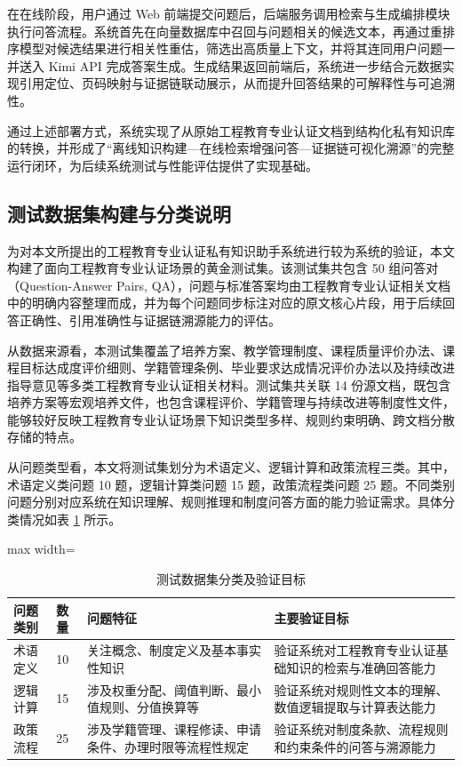 \documentclass[UTF8,a4paper,zihao=-4]{ctexart}
\begin{document}
在在线阶段，用户通过 Web 前端提交问题后，后端服务调用检索与生成编排模块执行问答流程。系统首先在向量数据库中召回与问题相关的候选文本，再通过重排序模型对候选结果进行相关性重估，筛选出高质量上下文，并将其连同用户问题一并送入 Kimi API 完成答案生成。生成结果返回前端后，系统进一步结合元数据实现引用定位、页码映射与证据链联动展示，从而提升回答结果的可解释性与可追溯性。

通过上述部署方式，系统实现了从原始工程教育专业认证文档到结构化私有知识库的转换，并形成了“离线知识构建—在线检索增强问答—证据链可视化溯源”的完整运行闭环，为后续系统测试与性能评估提供了实现基础。

\subsection{测试数据集构建与分类说明}

为对本文所提出的工程教育专业认证私有知识助手系统进行较为系统的验证，本文构建了面向工程教育专业认证场景的黄金测试集。该测试集共包含 50 组问答对（Question-Answer Pairs, QA），问题与标准答案均由工程教育专业认证相关文档中的明确内容整理而成，并为每个问题同步标注对应的原文核心片段，用于后续回答正确性、引用准确性与证据链溯源能力的评估。

从数据来源看，本测试集覆盖了培养方案、教学管理制度、课程质量评价办法、课程目标达成度评价细则、学籍管理条例、毕业要求达成情况评价办法以及持续改进指导意见等多类工程教育专业认证相关材料。测试集共关联 14 份源文档，既包含培养方案等宏观培养文件，也包含课程评价、学籍管理与持续改进等制度性文件，能够较好反映工程教育专业认证场景下知识类型多样、规则约束明确、跨文档分散存储的特点。

从问题类型看，本文将测试集划分为术语定义、逻辑计算和政策流程三类。其中，术语定义类问题 10 题，逻辑计算类问题 15 题，政策流程类问题 25 题。不同类别问题分别对应系统在知识理解、规则推理和制度问答方面的能力验证需求。具体分类情况如表 \ref{tab:testset_category} 所示。

\begin{table}[H]
\centering
\caption{测试数据集分类及验证目标}
\label{tab:testset_category}
{\small
\renewcommand{\arraystretch}{1.2}
\begin{adjustbox}{max width=\textwidth}
\begin{tabular}{llll}
\toprule
问题类别 & 数量 & 问题特征 & 主要验证目标 \\
\midrule
术语定义 & 10 & 关注概念、制度定义及基本事实性知识 & 验证系统对工程教育专业认证基础知识的检索与准确回答能力 \\
逻辑计算 & 15 & 涉及权重分配、阈值判断、最小值规则、分值换算等 & 验证系统对规则性文本的理解、数值逻辑提取与计算表达能力 \\
政策流程 & 25 & 涉及学籍管理、课程修读、申请条件、办理时限等流程性规定 & 验证系统对制度条款、流程规则和约束条件的问答与溯源能力 \\
\bottomrule
\end{tabular}
\end{adjustbox}
}
\end{table}
\end{document}
